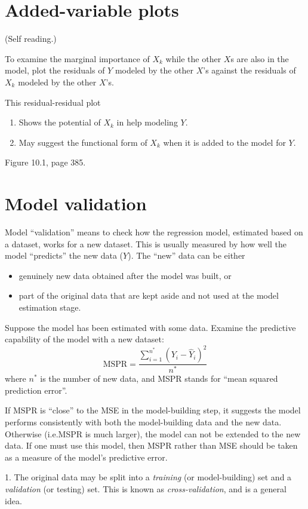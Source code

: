 \documentclass[12pt]{article}
\begin{document}
\section*{Added-variable plots}

(Self reading.)

To examine the marginal importance of $X_k$
while the other $X$s are also in the model,
plot the residuals of $Y$ modeled by the other $X$'s
against the residuals of $X_k$ modeled by the other $X$'s.

This residual-residual plot
\begin{enumerate}
\item Shows the potential of $X_k$
in help modeling $Y$.
\item May suggest the functional form of $X_k$
when it is added to the model for $Y$.
\end{enumerate}

\example
Figure 10.1, page 385.


\section{Model validation}

Model ``validation'' means to check how the regression model,
estimated based on a dataset, works for a new dataset.
This is usually measured by how well the model ``predicts'' the new data
($Y$).
The ``new'' data can be either
\begin{itemize}
\item genuinely new data obtained after the model was
built, or
\item part of the original data that are kept aside and not used at
the model estimation stage.
\end{itemize}

Suppose the model has been estimated with some data.
Examine the predictive capability of the model
with a new dataset:
\[
\text{MSPR} = \frac{\sum_{i=1}^{n^*} (Y_i - \hat{Y}_i)^2}{n^*}
\]
where $n^*$ is the number of new data,
and MSPR stands for ``mean squared prediction error''.

If MSPR is ``close'' to the MSE in the model-building step,
it suggests the model performs consistently with both the model-building
data and the new data.
Otherwise (i.e.\@ MSPR is much larger),
the model can not be extended to the new data.
If one must use this model, then MSPR rather than MSE should be taken as
a measure of the model's predictive error.

\alert
1. The original data may be split into a \emph{training} (or
model-building) set and a \emph{validation} (or testing) set.
This is known as \emph{cross-validation}, and is a general idea.
\end{document}
